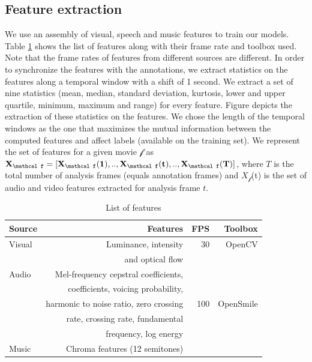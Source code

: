 \documentclass{article}
\begin{document}
\subsection{Feature extraction}
We use an assembly of visual, speech and music features to train our models.
Table \ref{table:features} shows the list of features along with their frame rate and toolbox used. 
Note that the frame rates of features from different sources are different.
In order to synchronize the features with the annotations, we extract statistics on the features along a temporal window with a shift of 1 second. 
We extract a set of nine statistics (mean, median, standard deviation, kurtosis, lower and upper quartile, minimum, maximum and range) for every feature. 
Figure \cite{} depicts the extraction of these statistics on the features.
We chose the length of the temporal windows as the one that maximizes the mutual information between the computed features and affect labels (available on the training set).
We represent the set of features for a given movie $\mathcal f$ as $\bf X_{\mathcal f} = [X_{\mathcal f}(1), .., X_{\mathcal f}(t), .., X_{\mathcal f}(T) ]$, where $T$ is the total number of analysis frames (equals annotation frames) and $X_{\mathcal f}$(t) is the set of audio and video features extracted for analysis frame $t$. 

\begin{table}[t]
\centering
\begin{tabular}{|@{}l@{}|r|r|r@{}|}
\hline
{\bf Source} &{\bf Features} & {\bf FPS} & {\bf Toolbox} \\ \hline
Visual & Luminance, intensity & 30 & OpenCV \\ 
       & and optical flow & & \cite{} \\ \hline
Audio & Mel-frequency cepstral coefficients,& & \\
               & coefficients, voicing probability, & & \\  
               & harmonic to noise ratio, zero crossing & 100 & OpenSmile \\  
               & rate, crossing rate, fundamental & &\cite{} \\  
               & frequency, log energy & & \\ \cline{1-2}
Music & Chroma features (12 semitones) & & \\ \hline
\end{tabular}
\caption{List of features}
\label{table:features}
\end{table}
\end{document}

